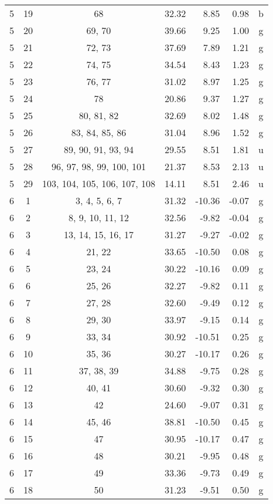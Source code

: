\begin{center}
\begin{longtable}{cccrrrc}
  5 & 19 & 68 & 32.32 &  8.85 &  0.98 & b\\
  5 & 20 & 69, 70 & 39.66 &  9.25 &  1.00 & g\\
  5 & 21 & 72, 73 & 37.69 &  7.89 &  1.21 & g\\
  5 & 22 & 74, 75 & 34.54 &  8.43 &  1.23 & g\\
  5 & 23 & 76, 77 & 31.02 &  8.97 &  1.25 & g\\
  5 & 24 & 78 & 20.86 &  9.37 &  1.27 & g\\
  5 & 25 & 80, 81, 82 & 32.69 &  8.02 &  1.48 & g\\
  5 & 26 & 83, 84, 85, 86 & 31.04 &  8.96 &  1.52 & g\\
  5 & 27 & 89, 90, 91, 93, 94 & 29.55 &  8.51 &  1.81 & u\\
  5 & 28 & 96, 97, 98, 99, 100, 101 & 21.37 &  8.53 &  2.13 & u\\
  5 & 29 & 103, 104, 105, 106, 107, 108 & 14.11 &  8.51 &  2.46 & u\\
  6 & 1 & 3, 4, 5, 6, 7 & 31.32 & -10.36 & -0.07 & g\\
  6 & 2 & 8, 9, 10, 11, 12 & 32.56 & -9.82 & -0.04 & g\\
  6 & 3 & 13, 14, 15, 16, 17 & 31.27 & -9.27 & -0.02 & g\\
  6 & 4 & 21, 22 & 33.65 & -10.50 &  0.08 & g\\
  6 & 5 & 23, 24 & 30.22 & -10.16 &  0.09 & g\\
  6 & 6 & 25, 26 & 32.27 & -9.82 &  0.11 & g\\
  6 & 7 & 27, 28 & 32.60 & -9.49 &  0.12 & g\\
  6 & 8 & 29, 30 & 33.97 & -9.15 &  0.14 & g\\
  6 & 9 & 33, 34 & 30.92 & -10.51 &  0.25 & g\\
  6 & 10 & 35, 36 & 30.27 & -10.17 &  0.26 & g\\
  6 & 11 & 37, 38, 39 & 34.88 & -9.75 &  0.28 & g\\
  6 & 12 & 40, 41 & 30.60 & -9.32 &  0.30 & g\\
  6 & 13 & 42 & 24.60 & -9.07 &  0.31 & g\\
  6 & 14 & 45, 46 & 38.81 & -10.50 &  0.45 & g\\
  6 & 15 & 47 & 30.95 & -10.17 &  0.47 & g\\
  6 & 16 & 48 & 30.21 & -9.95 &  0.48 & g\\
  6 & 17 & 49 & 33.36 & -9.73 &  0.49 & g\\
  6 & 18 & 50 & 31.23 & -9.51 &  0.50 & g\\

\end{longtable}
\end{center}
